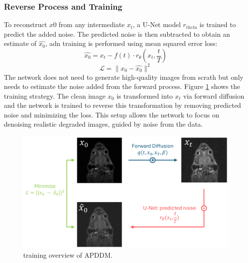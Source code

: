 \documentclass[twocolumn]{article}
\begin{document}
\subsubsection{Reverse Process and Training}
To reconstruct $x0$ from any intermediate $x_t$, a U-Net model $r_{theta}$ is trained to predict the added noise. The predicted noise is then subtracted to obtain an estimate of $\hat{x_0}$, adn training is performed using mean squared error loss: 
\begin{equation}\label{eq:Markov chain}
    \hat{x_0}=x_t-f(t) \cdot r_{\theta}(x_t,\frac{t}{T})
\end{equation}
\begin{equation}
    \mathcal{L}=\|x_0-\hat{x_0}\|^2
\end{equation}
The network does not need to generate high-quality images from scrath but only needs to estimate the noise added from the forward process. Figure \ref{fig:APDDM} shows the training strategy. The clean image $x_0$ is transformed into $x_t$ via forward diffusion and the network is trained to reverse this transformation by removing predicted noise and minimizing the loss. This setup allows the network to focus on denoising realistic degraded images, guided by noise from the data.

\begin{figure}[H]
    \centering
    \includegraphics[width=1\linewidth]{full APDDM .png}
    \caption{training overview of APDDM.}
    \label{fig:APDDM}
\end{figure}
\end{document}
